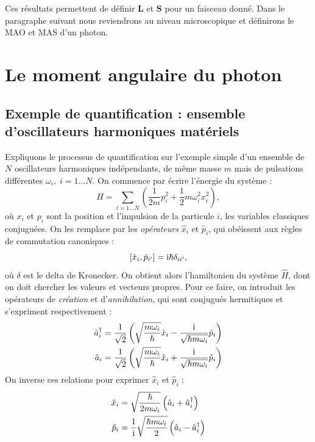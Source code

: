 Ces résultats permettent de définir $\bm{L}$ et $\bm{S}$ pour un faisceau donné. Dans le paragraphe suivant nous reviendrons au niveau microscopique et définirons le MAO et MAS d'un photon.

\section{Le moment angulaire du photon}
\subsection{Exemple de quantification : ensemble d'oscillateurs harmoniques matériels}
Expliquons le processus de quantification sur l'exemple simple d'un ensemble de $N$ oscillateurs harmoniques indépendants, de même masse $m$ mais de pulsations différentes $\omega_{i},\;i=1\ldots N$. On commence par écrire l'énergie du système :
\begin{equation}
H = \sum_{i=1\ldots N}\left(\frac{1}{2 m} p_i^2+\frac{1}{2} m \omega_i^2x_i^2\right),
\label{eq:oscharm1}
\end{equation}
où $x_i$ et $p_i$ sont la position et l'impulsion de la particule $i$, les variables classiques conjuguées. On les remplace par les \textit{opérateurs} $\hat{x}_i$ et $\hat{p}_i$, qui obéissent aux règles de commutation canoniques :
\begin{equation}
\left[\hat{x}_i,\hat{p}_{i'}\right]=\mathrm{i}\hbar\delta_{ii'},
\end{equation}
où $\delta$ est le delta de Kronecker. On obtient alors l'hamiltonien du système $\hat{H}$, dont on doit chercher les valeurs et vecteurs propres. Pour ce faire, on introduit les opérateurs de \textit{création} et d'\textit{annihilation}, qui sont conjugués hermitiques et s'expriment respectivement :
\begin{align}
\hat{a}^{\dag}_{i} &= \frac{1}{\sqrt{2}}\left(\sqrt{\frac{m\omega_i}{\hbar}}\hat{x}_i-\frac{\mathrm{i}}{\sqrt{\hbar m \omega_i}}\hat{p}_{i}\right)\\
\hat{a}_{i} &= \frac{1}{\sqrt{2}}\left(\sqrt{\frac{m\omega_i}{\hbar}}\hat{x}_i+\frac{\mathrm{i}}{\sqrt{\hbar m \omega_i}}\hat{p}_{i}\right)\\
\end{align}
On inverse ces relations pour exprimer $\hat{x}_i$ et $\hat{p}_i$ :
\begin{align}
\hat{x}_i &= \sqrt{\frac{\hbar}{2m\omega_i}}\left(\hat{a}_{i}+\hat{a}^{\dag}_{i}\right)\\
\hat{p}_i &= \frac{1}{\mathrm{i}}\sqrt{\frac{\hbar m\omega_i}{2}}\left(\hat{a}_{i}-\hat{a}^{\dag}_{i}\right)\\
\end{align}
